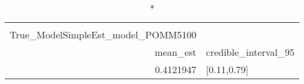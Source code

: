 \begin{longtable}{rl}
\caption*{
{\large alphasummarytable} \\ 
{\small True\_ModelSimpleEst\_model\_POMM5100}
} \\ 
\toprule
mean\_est & credible\_interval\_95 \\ 
\midrule
0.4121947 & [0.11,0.79] \\ 
\bottomrule
\end{longtable}

